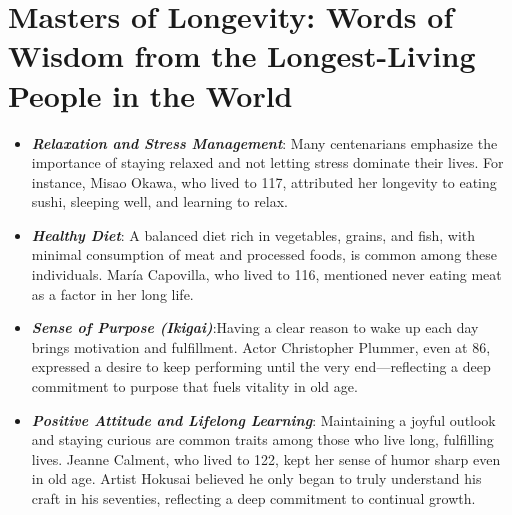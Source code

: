 \section*{Masters of Longevity: Words of Wisdom from the Longest-Living People in the World}
\begin{itemize}
    \item \textbf{\textit{Relaxation and Stress Management}}: Many centenarians emphasize the importance of staying relaxed and not letting stress dominate their lives. For instance, Misao Okawa, who lived to 117, attributed her longevity to eating sushi, sleeping well, and learning to relax.
    \item \textbf{\textit{Healthy Diet}}: A balanced diet rich in vegetables, grains, and fish, with minimal consumption of meat and processed foods, is common among these individuals. María Capovilla, who lived to 116, mentioned never eating meat as a factor in her long life.
    \item \textbf{\textit{Sense of Purpose (Ikigai)}}:Having a clear reason to wake up each day brings motivation and fulfillment. Actor Christopher Plummer, even at 86, expressed a desire to keep performing until the very end—reflecting a deep commitment to purpose that fuels vitality in old age.
    \item \textbf{\textit{Positive Attitude and Lifelong Learning}}: Maintaining a joyful outlook and staying curious are common traits among those who live long, fulfilling lives. Jeanne Calment, who lived to 122, kept her sense of humor sharp even in old age. Artist Hokusai believed he only began to truly understand his craft in his seventies, reflecting a deep commitment to continual growth.
\end{itemize}